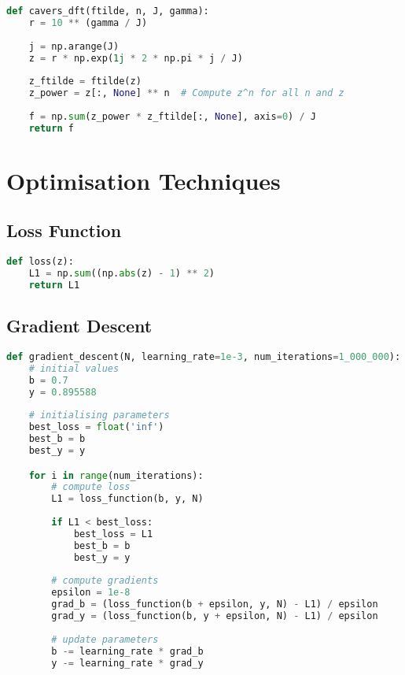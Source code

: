 \begin{appendices}
\begin{lstlisting}[language=Python, caption= Implementation of \citet{Cavers1978FFT}'s DFT NIZT (Equation \ref{equation:cavers_sum})]
def cavers_dft(ftilde, n, J, gamma):
    r = 10 ** (gamma / J)
    
    j = np.arange(J)
    z = r * np.exp(1j * 2 * np.pi * j / J)
    
    z_ftilde = ftilde(z)
    z_power = z[:, None] ** n  # Compute z^n for all n and z
    
    f = np.sum(z_power * z_ftilde[:, None], axis=0) / J
    return f
\end{lstlisting}

\newpage
\section{Optimisation Techniques}

\subsection{Loss Function}
\begin{lstlisting}[language=Python, caption= null]
def loss(z):
    L1 = np.sum((np.abs(z) - 1) ** 2)
    return L1
\end{lstlisting}

\subsection{Gradient Descent}
\begin{lstlisting}[language=Python, caption= null]
def gradient_descent(N, learning_rate=1e-3, num_iterations=1_000_000):
	# initial values
    b = 0.7
    y = 0.895588
    
    # initialising parameters
    best_loss = float('inf')
    best_b = b
    best_y = y

    for i in range(num_iterations):
        # compute loss
        L1 = loss_function(b, y, N)
        
        if L1 < best_loss:
            best_loss = L1
            best_b = b
            best_y = y
        
        # compute gradients 
        epsilon = 1e-8
        grad_b = (loss_function(b + epsilon, y, N) - L1) / epsilon
        grad_y = (loss_function(b, y + epsilon, N) - L1) / epsilon
        
        # update parameters
        b -= learning_rate * grad_b
        y -= learning_rate * grad_y
    

\end{lstlisting}
\end{appendices}
